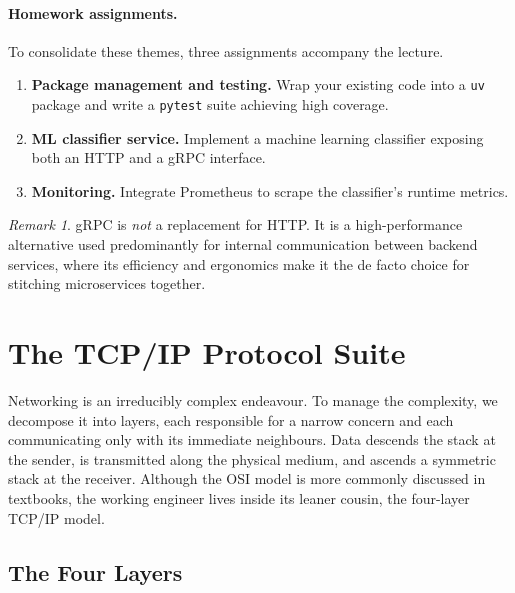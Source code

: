 \documentclass[11pt,a4paper]{article}
\theoremstyle{definition}
\theoremstyle{remark}
\newtheorem*{remark}{Remark}
\begin{document}
\paragraph{Homework assignments.}
To consolidate these themes, three assignments accompany the lecture.
\begin{enumerate}
    \item \textbf{Package management and testing.} Wrap your existing code into a \texttt{uv} package and write a \texttt{pytest} suite achieving high coverage.
    \item \textbf{ML classifier service.} Implement a machine learning classifier exposing both an HTTP and a gRPC interface.
    \item \textbf{Monitoring.} Integrate Prometheus to scrape the classifier's runtime metrics.
\end{enumerate}

\begin{remark}
gRPC is \emph{not} a replacement for HTTP. It is a high-performance alternative used predominantly for internal communication between backend services, where its efficiency and ergonomics make it the de facto choice for stitching microservices together.
\end{remark}

\section{The TCP/IP Protocol Suite}


Networking is an irreducibly complex endeavour. To manage the complexity, we decompose it into layers, each responsible for a narrow concern and each communicating only with its immediate neighbours. Data descends the stack at the sender, is transmitted along the physical medium, and ascends a symmetric stack at the receiver. Although the OSI model is more commonly discussed in textbooks, the working engineer lives inside its leaner cousin, the four-layer TCP/IP model.

\subsection{The Four Layers}
\end{document}
